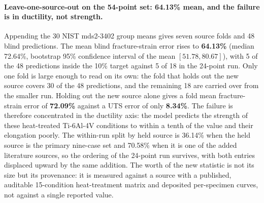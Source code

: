\documentclass[11pt,a4paper,twocolumn]{article}
\begin{document}
\paragraph{Leave-one-source-out on the 54-point set: 64.13\% mean, and the failure is in ductility, not strength.} Appending the 30 NIST mds2-3402 group means gives seven source folds and 48 blind predictions. The mean blind fracture-strain error rises to \textbf{64.13\%} (median 72.64\%, bootstrap 95\% confidence interval of the mean $[51.78, 80.67]$), with 5 of the 48 predictions inside the 10\% target against 5 of 18 in the 24-point run. Only one fold is large enough to read on its own: the fold that holds out the new source covers 30 of the 48 predictions, and the remaining 18 are carried over from the smaller run. Holding out the new source alone gives a fold mean fracture-strain error of \textbf{72.09\%} against a UTS error of only \textbf{8.34\%}. The failure is therefore concentrated in the ductility axis: the model predicts the strength of these heat-treated Ti-6Al-4V conditions to within a tenth of the value and their elongation poorly. The within-run split by held source is 36.14\% when the held source is the primary nine-case set and 70.58\% when it is one of the added literature sources, so the ordering of the 24-point run survives, with both entries displaced upward by the same addition. The worth of the new statistic is not its size but its provenance: it is measured against a source with a published, auditable 15-condition heat-treatment matrix and deposited per-specimen curves, not against a single reported value.
\end{document}
